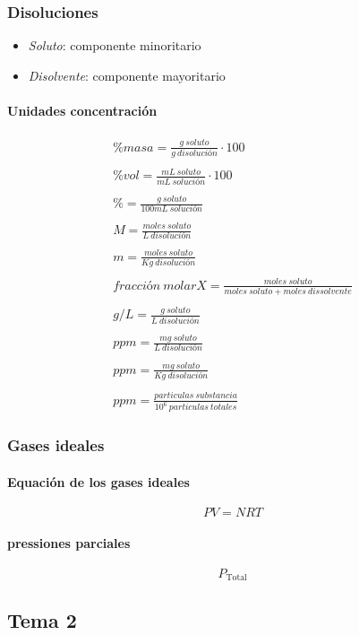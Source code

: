 \documentclass[a4paper,12pt]{article}
\begin{document}
\subsubsection{Disoluciones}
\begin{itemize}
    \item \emph{Soluto}: componente minoritario
    \item \emph{Disolvente}: componente mayoritario
\end{itemize}
\paragraph{Unidades concentración}
\begin{gather}     
    \%masa=\frac{g\ soluto}{g\ disolución}\cdot100\\\\
    \%vol=\frac{mL\ soluto}{mL\ solución}\cdot100\\\\
    \%=\frac{g\ soluto}{100mL\ solución}\\\\
    M=\frac{moles\ soluto}{L\ disolución}\\\\
    m=\frac{moles\ soluto}{Kg\ disolución}\\\\
    fracción\ molar X=\frac{moles\ soluto}{moles\ soluto+moles\ dissolvente}\\\\
    g/L=\frac{g\ soluto}{L\ disolución}\\\\
    ppm=\frac{mg\ soluto}{L\ disolución}\\\\
    ppm=\frac{mg\ soluto}{Kg\ disolución}\\\\
    ppm=\frac{particulas\ substancia}{10^6\ particulas\ totales}
\end{gather}
\subsubsection{Gases ideales}
\paragraph{Equación de los gases ideales}
\begin{equation}
    PV=NRT
\end{equation}
\paragraph{pressiones parciales}
\begin{equation}
    P_\text{Total}
\end{equation}
\subsection{Tema 2}
\end{document}
